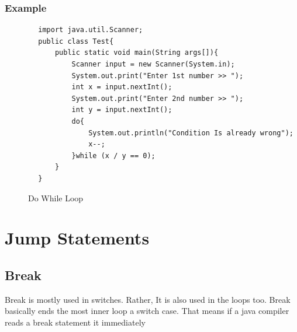 \documentclass[openany]{book}  %
\begin{document}
\subsubsection{Example}
\begin{center}
    \footnotesize
    \begin{verbatim}
        import java.util.Scanner;
        public class Test{
            public static void main(String args[]){
                Scanner input = new Scanner(System.in);
                System.out.print("Enter 1st number >> ");
                int x = input.nextInt();
                System.out.print("Enter 2nd number >> ");
                int y = input.nextInt();
                do{
                    System.out.println("Condition Is already wrong");
                    x--;
                }while (x / y == 0);
            }
        }
    \end{verbatim}
\end{center}
% 
% 
\begin{figure}[htbp]
    \begin{center}
        \caption{Do While Loop\cite{Ref3}}
    \end{center}
\end{figure}
% 
% 
\section{Jump Statements}
% 
% 
\subsection{Break}
Break is mostly used in switches.
Rather, It is also used in the loops too. Break basically ends the most inner loop a switch case. That means if a java compiler reads a break statement
it immediately


\the \evensidemargin\\
\the \oddsidemargin
\end{document}
